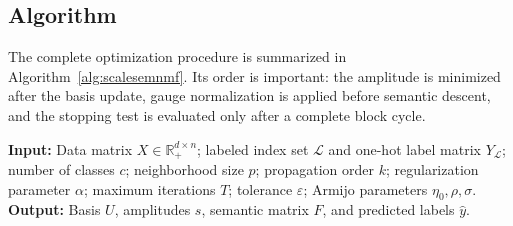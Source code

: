 \documentclass[a4paper,preprint,12pt]{elsarticle}
\theoremstyle{remark}
\begin{document}
\subsection{Algorithm}

The complete optimization procedure is summarized in Algorithm~\ref{alg:scalesemnmf}. Its order is important: the amplitude is minimized after the basis update, gauge normalization is applied before semantic descent, and the stopping test is evaluated only after a complete block cycle.

\begin{algorithm}[!htbp]
\caption{Optimization procedure for ScaleSem-NMF}
\label{alg:scalesemnmf}
\scriptsize
\textbf{Input:} Data matrix \(X\in\mathbb R_+^{d\times n}\); labeled index set \(\mathcal L\) and one-hot label matrix \(Y_{\mathcal L}\); number of classes \(c\); neighborhood size \(p\); propagation order \(k\); regularization parameter \(\alpha\); maximum iterations \(T\); tolerance \(\varepsilon\); Armijo parameters \(\eta_0,\rho,\sigma\).\\
\textbf{Output:} Basis \(U\), amplitudes \(s\), semantic matrix \(F\), and predicted labels \(\widehat y\).


\end{algorithm}
\end{document}
